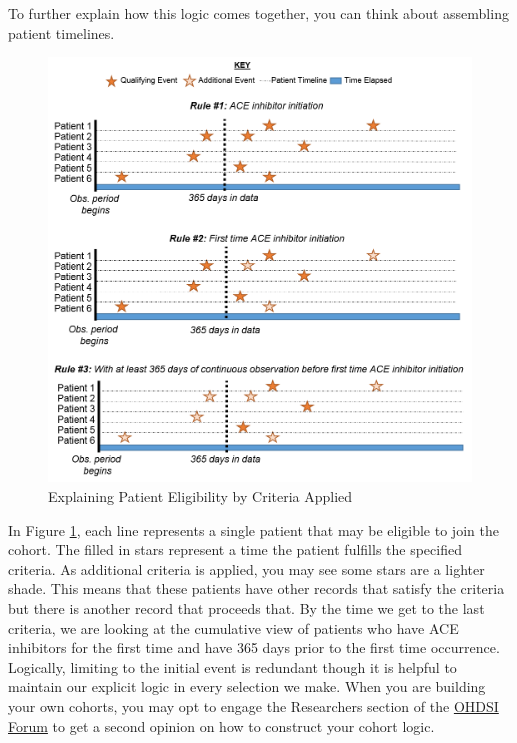 \documentclass[11pt]{book}
\theoremstyle{definition}
\theoremstyle{definition}
\theoremstyle{definition}
\theoremstyle{remark}
\begin{document}
To further explain how this logic comes together, you can think about assembling patient timelines.

\begin{figure}

{\centering \includegraphics[width=0.5\linewidth]{images/Cohorts/EarliestEventExplained} 

}

\caption{Explaining Patient Eligibility by Criteria Applied}\label{fig:EarliestEventExplained}
\end{figure}

In Figure \ref{fig:EarliestEventExplained}, each line represents a single patient that may be eligible to join the cohort. The filled in stars represent a time the patient fulfills the specified criteria. As additional criteria is applied, you may see some stars are a lighter shade. This means that these patients have other records that satisfy the criteria but there is another record that proceeds that. By the time we get to the last criteria, we are looking at the cumulative view of patients who have ACE inhibitors for the first time and have 365 days prior to the first time occurrence. Logically, limiting to the initial event is redundant though it is helpful to maintain our explicit logic in every selection we make. When you are building your own cohorts, you may opt to engage the Researchers section of the \href{http://forums.ohdsi.org}{OHDSI Forum} to get a second opinion on how to construct your cohort logic.
\end{document}
